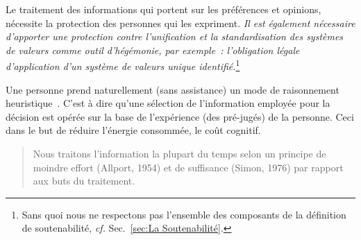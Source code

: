  Le traitement des informations qui portent sur les préférences et opinions, nécessite la protection des personnes qui les expriment.
 \emph{Il est également nécessaire d'apporter une protection contre l'unification et la standardisation des systèmes de valeurs comme outil d'hégémonie, par exemple~: l'obligation légale d'application d'un système de valeurs unique identifié.}\footnote{Sans quoi nous ne respectons pas l'ensemble des composants de la définition de soutenabilité, \textit{cf.} Sec.~\ref{sec:La Soutenabilité}.} %
  
 
 
 Une personne prend naturellement (sans assistance) un mode de raisonnement heuristique~\cite{meyer_modetraitement_2000}.
 C'est à dire qu'une sélection de l'information employée pour la décision est opérée sur la base de l'expérience (des pré-jugés) de la personne.
 Ceci dans le but de réduire l'énergie consommée, le coût cognitif.
 \blockcquote{meyer_modetraitement_2000}{Nous traitons l'information la plupart du temps selon un principe de moindre effort (Allport, 1954) et de suffisance
 (Simon, 1976) par rapport aux buts du traitement.}
 
